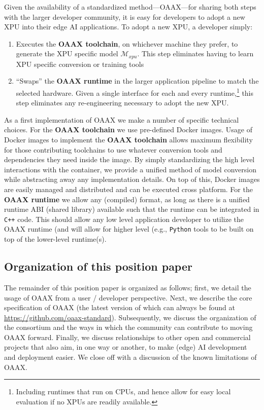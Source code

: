 \documentclass{article}
\newcommand{\oaaxgit}{\href{https://github.com/oaax-standard}{https://github.com/oaax-standard}}
\begin{document}
Given the availability of a standardized method---OAAX---for sharing both steps with the larger developer community, it is easy for developers to adopt a new XPU into their edge AI applications. To adopt a new XPU, a developer simply:
\begin{enumerate}
\item Executes the \textbf{OAAX toolchain}, on whichever machine they prefer, to generate the XPU specific model $\mathcal{M}_{xpu}$. This step eliminates having to learn XPU specific conversion or training tools
\item ``Swaps'' the \textbf{OAAX runtime} in the larger application pipeline to match the selected hardware. Given a single interface for each and every runtime,\footnote{Including runtimes that run on CPUs, and hence allow for easy local evaluation if no XPUs are readily available.} this step eliminates any re-engineering necessary to adopt the new XPU.
\end{enumerate}

As a first implementation of OAAX we make a number of specific technical choices. For the \textbf{OAAX toolchain} we use pre-defined Docker images. Usage of Docker images to implement the  \textbf{OAAX toolchain} allows maximum flexibility for those contributing toolchains to use whatever conversion tools and dependencies they need inside the image. By simply standardizing the high level interactions with the container, we provide a unified method of model conversion while abstracting away any implementation details. On top of this, Docker images are easily managed and distributed and can be executed cross platform. For the  \textbf{OAAX runtime} we allow any (compiled) format, as long as there is a unified runtime ABI (shared library) available such that the runtime can be integrated in \texttt{C++} code. This should allow any low level application developer to utilize the OAAX runtime (and will allow for higher level (e.g., \texttt{Python} tools to be built on top of the lower-level runtime(s).

\subsection{Organization of this position paper}

The remainder of this position paper is organized as follows; first, we detail the usage of OAAX from a user / developer perspective. Next, we describe the core specification of OAAX (the latest version of which can always be found at \oaaxgit). Subsequently, we discuss the organization of the consortium and the ways in which the community can contribute to moving OAAX forward. Finally, we discuss relationships to other open and commercial projects that also aim, in one way or another, to make (edge) AI development and deployment easier. We close off with a discussion of the known limitations of OAAX.
\end{document}

